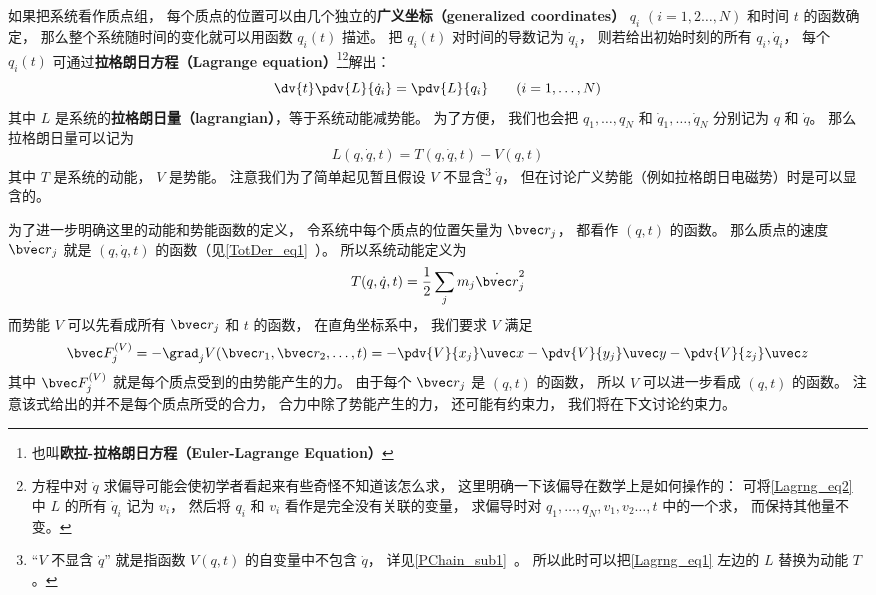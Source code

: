 

如果把系统看作质点组， 每个质点的位置可以由几个独立的\textbf{广义坐标（generalized coordinates）} $q_i$ $(i=1,2\dots,N)$ 和时间 $t$ 的函数确定， 那么整个系统随时间的变化就可以用函数 $q_i(t)$ 描述。 把 $q_i(t)$ 对时间的导数记为 $\dot q_i$， 则若给出初始时刻的所有 $q_i, \dot q_i$， 每个 $q_i(t)$ 可通过\textbf{拉格朗日方程（Lagrange equation）}\footnote{也叫\textbf{欧拉-拉格朗日方程（Euler-Lagrange Equation）}}\footnote{方程中对 $\dot q$ 求偏导可能会使初学者看起来有些奇怪不知道该怎么求， 这里明确一下该偏导在数学上是如何操作的： 可将\autoref{Lagrng_eq2} 中 $L$ 的所有 $\dot q_i$ 记为 $v_i$， 然后将 $q_i$ 和 $v_i$ 看作是完全没有关联的变量， 求偏导时对 $q_1,\dots, q_N, v_1, v_2\dots,t$ 中的一个求， 而保持其他量不变。}解出：
\begin{equation}\label{Lagrng_eq1}
\dv{t} \pdv{L}{\dot q_i} = \pdv{L}{q_i}
\qquad (i=1,\dots,N)
\end{equation}
其中 $L$ 是系统的\textbf{拉格朗日量（lagrangian）}，等于系统动能减势能。 为了方便， 我们也会把 $q_1, \dots, q_N$ 和 $\dot q_1,\dots,\dot q_N$ 分别记为 $q$ 和 $\dot q$。 那么拉格朗日量可以记为
\begin{equation}\label{Lagrng_eq2}
L(q, \dot q, t) = T(q, \dot q, t) - V(q, t)
\end{equation}
其中 $T$ 是系统的动能， $V$ 是势能。 注意我们为了简单起见暂且假设 $V$ 不显含\footnote{“$V$ 不显含 $\dot q$” 就是指函数 $V(q,t)$ 的自变量中不包含 $\dot q$， 详见\autoref{PChain_sub1}~。 所以此时可以把\autoref{Lagrng_eq1} 左边的 $L$ 替换为动能 $T$。} $\dot q$， 但在讨论广义势能（例如拉格朗日电磁势）时是可以显含的。

为了进一步明确这里的动能和势能函数的定义， 令系统中每个质点的位置矢量为 $\bvec r_j$， 都看作 $(q, t)$ 的函数。 那么质点的速度 $\dot{\bvec r}_j$ 就是 $(q,\dot q, t)$ 的函数（见\autoref{TotDer_eq1}~）。 所以系统动能定义为
\begin{equation}
T(q, \dot q, t) = \frac{1}{2}\sum_j m_j\dot {\bvec r}_j^2
\end{equation}
而势能 $V$ 可以先看成所有 $\bvec r_j$ 和 $t$ 的函数， 在直角坐标系中， 我们要求 $V$ 满足
\begin{equation}
\bvec F_j^{(V)} = - \grad_j V(\bvec r_1,\bvec r_2, \dots, t) = -\pdv{V}{x_j}\uvec x - \pdv{V}{y_j}\uvec y - \pdv{V}{z_j} \uvec z
\end{equation}
其中 $\bvec F_j^{(V)}$ 就是每个质点受到的由势能产生的力。 由于每个 $\bvec r_j$ 是 $(q, t)$ 的函数， 所以 $V$ 可以进一步看成 $(q, t)$ 的函数。 注意该式给出的并不是每个质点所受的合力， 合力中除了势能产生的力， 还可能有约束力， 我们将在下文讨论约束力。

